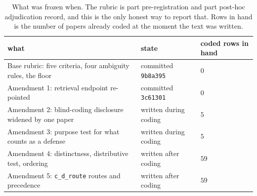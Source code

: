 \documentclass{article}
\begin{document}
\begin{table}[t]
\centering
\caption{What was frozen when. The rubric is part pre-registration and part post-hoc adjudication record, and this is the only honest way to report that. Rows in hand is the number of papers already coded at the moment the text was written.}
\label{tab:audit_timeline}
\footnotesize
\begin{tabular}{lll}
\toprule
what & state & coded rows in hand \\
\midrule
Base rubric: five criteria, four ambiguity rules, the floor & committed \texttt{9b8a395} & $0$ \\
Amendment 1: retrieval endpoint re-pointed & committed \texttt{3c61301} & $0$ \\
Amendment 2: blind-coding disclosure widened by one paper & written during coding & $5$ \\
Amendment 3: purpose test for what counts as a defense & written during coding & $5$ \\
Amendment 4: distinctness, distributive test, ordering & written after coding & $59$ \\
Amendment 5: \texttt{c\_d\_route} routes and precedence & written after coding & $59$ \\
\bottomrule
\end{tabular}
\end{table}
\end{document}
